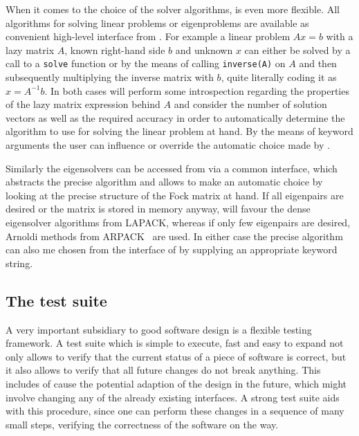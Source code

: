When it comes to the choice of the solver algorithms, \lazyten is even more flexible.
All algorithms for solving linear problems or eigenproblems are available as 
convenient high-level interface from \gscf.
For example a linear problem $A x = b$ with a lazy matrix $A$, known right-hand side $b$
and unknown $x$ can either be solved by a call to a \texttt{solve} function or by
the means of calling \texttt{inverse(A)} on $A$ and then subsequently
multiplying the inverse matrix with $b$, quite literally coding it as $x = A^{-1} b$.
In both cases \lazyten will perform some introspection regarding the properties of
the lazy matrix expression behind $A$ and consider the number of solution
vectors as well as the required accuracy in order to automatically determine the algorithm to use
for solving the linear problem at hand.
By the means of keyword arguments the user can influence or override the automatic
choice made by \lazyten.

Similarly the eigensolvers can be accessed from \gscf via a common interface,
which abstracts the precise algorithm and allows \lazyten to make an automatic
choice by looking at the precise structure of the Fock matrix at hand.
If all eigenpairs are desired or the matrix is stored in memory anyway,
\lazyten will favour the dense eigensolver algorithms from LAPACK,
whereas if only few eigenpairs are desired,
Arnoldi methods from ARPACK~\cite{Lehoucq1998} are used.
In either case the precise algorithm can also me chosen from the \python interface
of \molsturm by supplying an appropriate keyword string.


%
%
\subsection{The \molsturm test suite}
A very important subsidiary to good software design is a flexible testing framework.
A test suite which is simple to execute, fast and easy to expand not only allows to verify
that the current status of a piece of software is correct,
but it also allows to verify that all future changes do not break anything.
This includes of cause the potential adaption of the design in the future,
which might involve changing any of the already existing interfaces.
A strong test suite aids with this procedure,
since one can perform these changes in a sequence of many small steps,
verifying the correctness of the software on the way.

